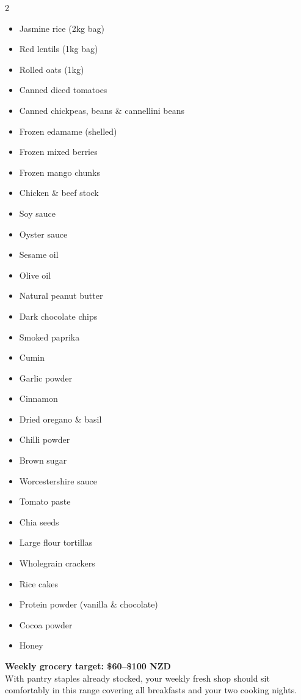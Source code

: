 \documentclass[12pt, a4paper]{book}
\begin{document}
\begin{multicols}{2}
\begin{itemize}[leftmargin=1.5em, itemsep=4pt]
  \item Jasmine rice (2kg bag)
  \item Red lentils (1kg bag)
  \item Rolled oats (1kg)
  \item Canned diced tomatoes
  \item Canned chickpeas, beans \& cannellini beans
  \item Frozen edamame (shelled)
  \item Frozen mixed berries
  \item Frozen mango chunks
  \item Chicken \& beef stock
  \item Soy sauce
  \item Oyster sauce
  \item Sesame oil
  \item Olive oil
  \item Natural peanut butter
  \item Dark chocolate chips
  \item Smoked paprika
  \item Cumin
  \item Garlic powder
  \item Cinnamon
  \item Dried oregano \& basil
  \item Chilli powder
  \item Brown sugar
  \item Worcestershire sauce
  \item Tomato paste
  \item Chia seeds
  \item Large flour tortillas
  \item Wholegrain crackers
  \item Rice cakes
  \item Protein powder (vanilla \& chocolate)
  \item Cocoa powder
  \item Honey
\end{itemize}
\end{multicols}

\vspace{1cm}
\begin{macrobox}
  \textbf{Weekly grocery target: \$60--\$100 NZD}\\[4pt]
  With pantry staples already stocked, your weekly fresh shop should sit comfortably in this range covering all breakfasts and your two cooking nights.
\end{macrobox}
\end{document}
